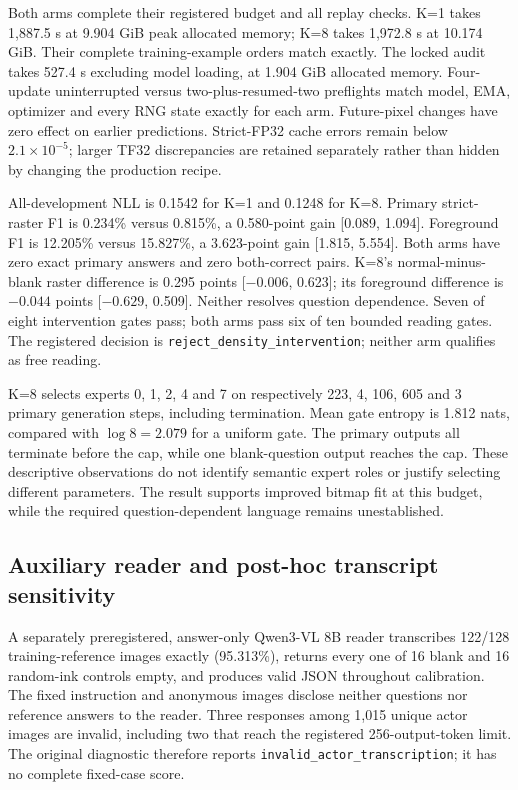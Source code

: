 \documentclass[10pt,a4paper]{article}
\providecommand{\DIFadd}[1]{{\protect\color{blue} \sf #1}} %
\providecommand{\DIFaddbegin}{} %
\begin{document}
Both arms complete their registered budget and all replay checks. K=1 takes
1,887.5 s at 9.904 GiB peak allocated memory; K=8 takes 1,972.8 s at 10.174 GiB.
Their complete training-example orders match exactly. The locked audit takes
527.4 s excluding model loading, at 1.904 GiB allocated memory. Four-update
uninterrupted versus two-plus-resumed-two preflights match model, EMA,
optimizer and every RNG state exactly for each arm. Future-pixel changes
have zero effect on earlier predictions. Strict-FP32 cache errors remain
below $2.1\times10^{-5}$; larger TF32 discrepancies are retained separately
rather than hidden by changing the production recipe.

All-development NLL is 0.1542 for K=1 and 0.1248 for K=8. Primary strict-raster
F1 is 0.234\% versus 0.815\%, a 0.580-point gain [0.089, 1.094]. Foreground
F1 is 12.205\% versus 15.827\%, a 3.623-point gain [1.815, 5.554]. Both
arms have zero exact primary answers and zero both-correct pairs. K=8's
normal-minus-blank raster difference is 0.295 points [$-0.006$, 0.623]; its
foreground difference is $-0.044$ points [$-0.629$, 0.509]. Neither resolves
question dependence. Seven of eight intervention gates pass; both arms pass
six of ten bounded reading gates. The registered decision is
\texttt{reject\_density\_intervention}; neither arm qualifies as free reading.

K=8 selects experts 0, 1, 2, 4 and 7 on respectively 223, 4, 106, 605 and 3
primary generation steps, including termination. Mean gate entropy is 1.812
nats, compared with $\log 8=2.079$ for a uniform gate. The primary outputs all
terminate before the cap, while one blank-question output reaches the cap.
These descriptive observations do not identify semantic expert roles or
justify selecting different parameters. The result supports improved bitmap
fit at this budget, while the required question-dependent language remains
unestablished.

\DIFaddbegin \subsection*{\DIFadd{Auxiliary reader and post-hoc transcript sensitivity}}
\DIFadd{A separately preregistered, answer-only Qwen3-VL 8B reader transcribes
122/128 training-reference images exactly (95.313\%), returns every one of
16 blank and 16 random-ink controls empty, and produces valid JSON throughout
calibration. The fixed instruction and anonymous images disclose neither
questions nor reference answers to the reader. Three responses among 1,015
unique actor images are invalid, including two that reach the registered
256-output-token limit. The original diagnostic therefore reports
\texttt{invalid\_actor\_transcription}; it has no complete fixed-case score.
}
\end{document}
